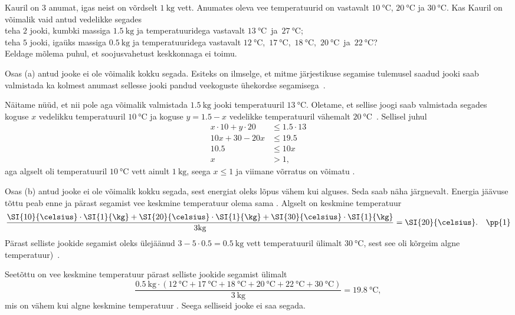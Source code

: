 
Kauril on 3 anumat, igas neist on võrdselt $\SI{1}{\kilo\gram}$ vett. Anumates oleva vee temperatuurid on vastavalt $\SI{10}{\celsius}$, $\SI{20}{\celsius}$ ja $\SI{30}{\celsius}$.
Kas Kauril on võimalik vaid antud vedelikke segades \\
\osa teha $2$ jooki, kumbki massiga $\SI{1.5}{\kilo\gram}$ ja temperatuuridega vastavalt $\SI{13}{\celsius}$~ja~$\SI{27}{\celsius}$;\\
\osa teha $5$ jooki, igaüks massiga $\SI{0.5}{\kilo\gram}$ ja temperatuuridega vastavalt $\SI{12}{\celsius}$,~$\SI{17}{\celsius}$,~$\SI{18}{\celsius}$,~$\SI{20}{\celsius}$~ja~$\SI{22}{\celsius}$?\\
Eeldage mõlema puhul, et soojusvahetust keskkonnaga ei toimu.



\hint

\solu
Osas (a) antud jooke ei ole võimalik kokku segada. Esiteks on ilmselge, et mitme järjestikuse segamise tulemusel saadud jooki saab valmistada ka kolmest anumast sellesse jooki pandud veekoguste ühekordse segamisega~.\par
Näitame nüüd, et nii pole aga võimalik valmistada $\SI{1.5}{\kilo\gram}$ jooki temperatuuril $\SI{13}{\celsius}$. Oletame, et sellise joogi saab valmistada segades koguse $x$ vedelikku temperatuuril $\SI{10}{\celsius}$ ja koguse $y=\num{1.5}-x$ vedelikke temperatuuril vähemalt $\SI{20}{\celsius}$~. Sellisel juhul
\begin{align*}
x\cdot 10+y\cdot 20 &\leq 1.5\cdot 13 \\
10x+30-20x &\leq 19.5 \\
10.5 &\leq 10 x \\
x &> 1,
\end{align*}
aga algselt oli temperatuuril $\SI{10}{\celsius}$ vett ainult $\SI{1}{\kilo\gram}$, seega $x\leq 1$ ja viimane võrratus on võimatu .

Osas (b) antud jooke ei ole võimalik kokku segada, sest energiat oleks lõpus vähem kui alguses. Seda saab näha järgnevalt. Energia jäävuse tõttu peab enne ja pärast segamist vee keskmine temperatuur olema sama . Algselt on keskmine temperatuur $$\frac{\SI{10}{\celsius} \cdot \SI{1}{\kg} +\SI{20}{\celsius} \cdot \SI{1}{\kg}+\SI{30}{\celsius} \cdot \SI{1}{\kg}}{3\text{kg}}=\SI{20}{\celsius}.  \quad \pp{1}$$
Pärast selliste jookide segamist oleks ülejäänud $3-5\cdot 0.5=\SI{0.5}{\kilo\gram}$ vett temperatuuril ülimalt $\SI{30}{\celsius}$, sest see oli kõrgeim algne temperatuur)~. \par
Seetõttu on vee keskmine temperatuur pärast selliste jookide segamist ülimalt
$$\frac{\SI{0.5}{\kg}\cdot(\SI{12}{\celsius} +\SI{17}{\celsius} +\SI{18}{\celsius}+\SI{20}{\celsius} +\SI{22}{\celsius}+\SI{30}{\celsius})}{\SI{3}{\kg}}=\SI{19.8}{\celsius},$$
mis on vähem kui algne keskmine temperatuur . Seega selliseid jooke ei saa segada.
\probend